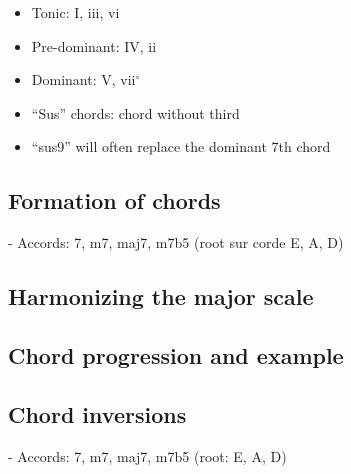 \documentclass{article}
\begin{document}
\begin{itemize}
	\item Tonic: I, iii, vi
	\item Pre-dominant: IV, ii
	\item Dominant: V, vii$^\circ$
\end{itemize}


\begin{itemize}
	\item ``Sus'' chords: chord without third
	\item ``sus9'' will often replace the dominant 7th chord
\end{itemize}

\newpage
\subsection{Formation of chords}



- Accords: 7, m7, maj7, m7b5 (root sur corde E, A, D)

\newpage
\subsection{Harmonizing the major scale}




\newpage
\subsection{Chord progression and example}



\newpage
\subsection{Chord inversions}

- Accords: 7, m7, maj7, m7b5 (root: E, A, D)
\end{document}
